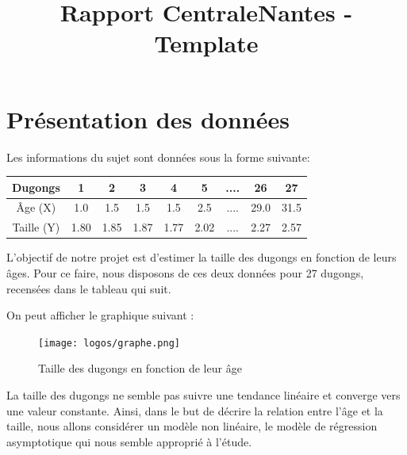 \documentclass{rapportECN}
\title{Rapport CentraleNantes - Template}
\begin{document}



\fairemarges
\fairepagedegarde

\section*{Présentation des données}

Les informations du sujet sont données sous la forme suivante: 

\begin{center}
\begin{tabular}{|c|c|c|c|c|c|c|c|c|}
\hline
Dugongs & 1 & 2 & 3 & 4 & 5 & .... & 26 & 27 \\
\hline
Âge (X) & 1.0 & 1.5 & 1.5 & 1.5 & 2.5 & .... & 29.0 & 31.5 \\
\hline
Taille (Y) & 1.80 & 1.85  & 1.87 & 1.77 & 2.02 & .... & 2.27 & 2.57 \\
\hline
\end{tabular}
\end{center}

L'objectif de notre projet est d'estimer la taille des dugongs en fonction de leurs âges. Pour ce faire, nous disposons de ces deux données pour 27 dugongs, recensées dans le tableau qui suit. \newline

On peut afficher le graphique suivant : 
\begin{figure}[H]
\centering
\texttt{[image: logos/graphe.png]}
\caption{Taille des dugongs en fonction de leur âge}
\end{figure}

La taille des dugongs ne semble pas suivre une tendance linéaire et converge vers une valeur constante. Ainsi, dans le but de décrire la relation entre l'âge et la taille, nous allons considérer un modèle non linéaire, le modèle de régression asymptotique qui nous semble approprié à l'étude. \newline
\end{document}
